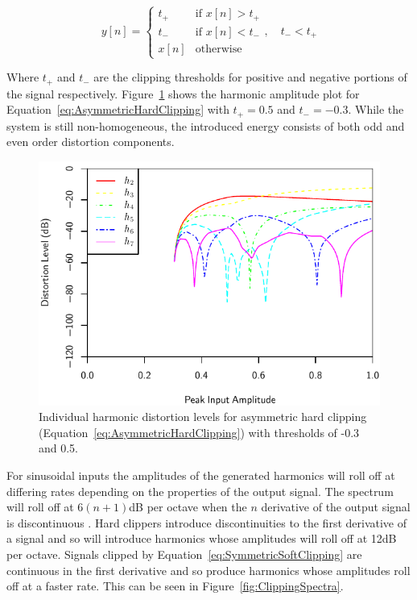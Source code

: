 			\begin{equation}
				y[n] = \begin{cases}
					t_{+} & \text{if $x[n] > t_{+}$} \\
					t_{-} & \text{if $x[n] < t_{-}$} \\
					x[n] & \text{otherwise}
				\end{cases}, \quad t_{-} < t_{+}
				\label{eq:AsymmetricHardClipping}
			\end{equation}

			Where $t_{+}$ and $t_{-}$ are the clipping thresholds for positive and negative portions of the
			signal respectively. Figure~\ref{fig:AsymmetricHardClippingHarmonics} shows the harmonic amplitude
			plot for Equation~\ref{eq:AsymmetricHardClipping} with $t_{+} = 0.5$ and $t_{-} = -0.3$. While the
			system is still non-homogeneous, the introduced energy consists of both odd and even order
			distortion components.

			\begin{figure}[h!]
				\centering
				\includegraphics{chapter5/Images/AsymmetricHardClippingHarmonics.pdf}
				\caption{Individual harmonic distortion levels for asymmetric hard clipping
					 (Equation~\ref{eq:AsymmetricHardClipping}) with thresholds of -0.3 and 0.5.}
				\label{fig:AsymmetricHardClippingHarmonics}
			\end{figure}

			For sinusoidal inputs the amplitudes of the generated harmonics will roll off at differing rates
			depending on the properties of the output signal. The spectrum will roll off at $6(n+1)$dB per
			octave when the $n$ derivative of the output signal is discontinuous
			\citep{kraght2000aliasing}.  Hard clippers introduce discontinuities to the first derivative of a
			signal and so will introduce harmonics whose amplitudes will roll off at 12dB per octave. Signals
			clipped by Equation~\ref{eq:SymmetricSoftClipping} are continuous in the first derivative and so
			produce harmonics whose amplitudes roll off at a faster rate. This can be seen in
			Figure~\ref{fig:ClippingSpectra}.

